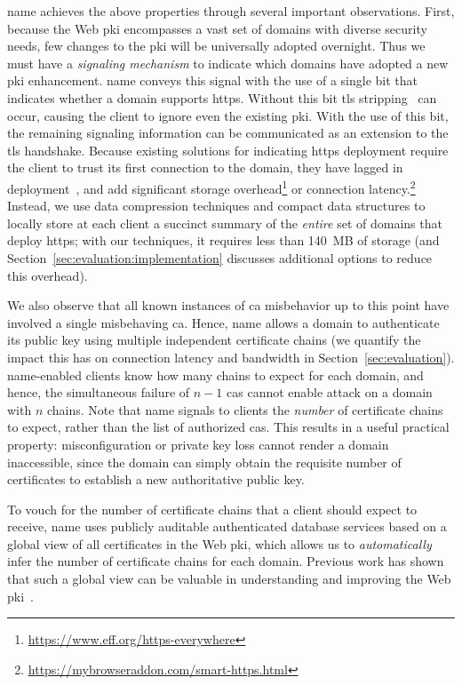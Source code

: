 \ac{name} achieves the above properties through several important observations.
First, because the Web \ac{pki} encompasses a vast set of domains with diverse
security needs, few changes to the \ac{pki} will be universally adopted
overnight. Thus we must have a \emph{signaling mechanism} to indicate which
domains have adopted a new \ac{pki} enhancement. \ac{name} conveys this signal
with the use of a single bit that indicates whether a domain supports
\ac{https}. Without this bit \ac{tls} stripping~\cite{marlinspike2009new} can
occur, causing the client to ignore even the existing \ac{pki}. With the use of
this bit, the remaining signaling information can be communicated as an
extension to the \ac{tls} handshake. Because existing solutions for indicating
\ac{https} deployment require the client to trust its first connection to the
domain, they have lagged in deployment~\cite{rfc4033, rfc6698}, and add
significant storage overhead\footnote{\url{https://www.eff.org/https-everywhere}}
or connection
latency.\footnote{\url{https://mybrowseraddon.com/smart-https.html}} Instead, we
use data compression techniques and compact data structures to locally store at
each client a succinct summary of the \emph{entire} set of domains that deploy
\ac{https}; with our techniques, it requires less than 140~MB of storage
(and Section~\ref{sec:evaluation:implementation} discusses additional options 
to reduce this overhead).

We also observe that all known instances of \ac{ca} misbehavior up to this point
have involved a single misbehaving \ac{ca}.  Hence, \ac{name} allows a domain to
authenticate its public key using multiple independent certificate chains (we
quantify the impact this has on connection latency and bandwidth in
Section~\ref{sec:evaluation}). \ac{name}-enabled clients know how many chains to
expect for each domain, and hence, the simultaneous failure of $n-1$ \acp{ca}
cannot enable  attack on a domain with $n$ chains. Note that \ac{name}
signals to clients the \emph{number} of certificate chains to expect, rather
than the list of authorized \acp{ca}.  This results in a useful practical
property: misconfiguration or private key loss cannot render a domain
inaccessible, since the domain can simply obtain the requisite number of
certificates to establish a new authoritative public key.

To vouch for the number of certificate chains that a client should expect to
receive, \ac{name} uses publicly auditable authenticated database services based
on a global view of all certificates in the Web \ac{pki}, which allows us to
\emph{automatically} infer the number of certificate chains for each domain.
Previous work has shown that such a global view can be valuable in understanding
and improving the Web \ac{pki}~\cite{durumeric2015search, larisch2017crlite}.

